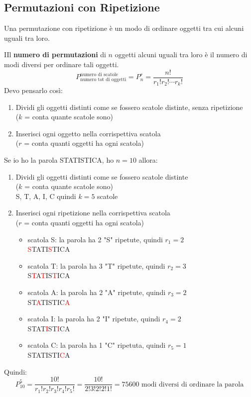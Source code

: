 \documentclass{article}  %
\theoremstyle{definition}
\begin{document}
\subsection{Permutazioni con Ripetizione}
Una permutazione con ripetizione è un modo di ordinare oggetti tra cui alcuni uguali tra loro.
\begin{theorem}{}
	IIl \textbf{numero di permutazioni} di $n$ oggetti alcuni uguali tra loro è il
	numero di modi diversi per ordinare tali oggetti.
	\[
		P_{\text{numero tot di oggetti}}^{\text{numero di scatole}}=P_n^r=\frac{n!}{r_1!r_2! \cdots r_k!}
	\]
	Devo pensarlo così:
	\begin{enumerate}
		\item Dividi gli oggetti distinti come se fossero scatole distinte, senza ripetizione \\ ($k$ = conta quante scatole sono)
		\item Inserisci ogni oggetto nella corrispettiva scatola \\ ($r$ = conta quanti oggetti ha ogni scatola)
	\end{enumerate}
\end{theorem}

\begin{esercizio}[Esempio]
	Se io ho la parola STATISTICA, ho $n=10$ allora:
	\begin{enumerate}
		\item Dividi gli oggetti distinti come se fossero scatole distinte \\ ($k$ = conta quante scatole sono) \\
		      S, T, A, I, C quindi $k=5$ scatole
		\item Inserisci ogni ripetizione nella corrispettiva scatola \\ ($r$ = conta quanti oggetti ha ogni scatola)
		      \begin{itemize}
			      \item scatola S: la parola ha 2 "S" ripetute, quindi $r_1=2$ \\
			            \textcolor{red}{S}TATI\textcolor{red}{S}TICA
			      \item scatola T: la parola ha 3 "T" ripetute, quindi $r_2=3$ \\
			            S\textcolor{red}{T}A\textcolor{red}{T}IS\textcolor{red}{T}ICA
			      \item scatola A: la parola ha 2 "A" ripetute, quindi $r_3=2$ \\
			            ST\textcolor{red}{A}TISTIC\textcolor{red}{A}
			      \item scatola I: la parola ha 2 "I" ripetute, quindi $r_4=2$ \\
			            STAT\textcolor{red}{I}ST\textcolor{red}{I}CA
			      \item scatola C: la parola ha 1 "C" ripetuta, quindi $r_5=1$ \\
			            STATISTI\textcolor{red}{C}A
		      \end{itemize}
	\end{enumerate}
	Quindi: \\
	\[
		P_{10}^5=\frac{10!}{r_1!r_2!r_3!r_4!r_5!}=\frac{10!}{2!3!2!2!1!}=75600 \text{ modi diversi di ordinare la parola}
	\]
\end{esercizio}
\end{document}

